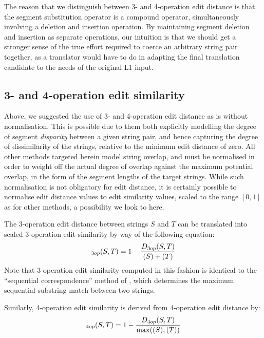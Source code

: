 The reason that we distinguish between 3- and 4-operation edit distance
is that the segment substitution operator is a compound operator,
simultaneously involving a deletion and insertion operation. By
maintaining segment deletion and insertion as separate operations, our
intuition is that we should get a stronger sense of the true effort
required to coerce an arbitrary string pair together, as a translator
would have to do in adapting the final translation candidate to the
needs of the original L1 input.


\subsection*{3- and 4-operation edit similarity}

Above, we suggested the use of 3- and 4-operation edit distance as is
without normalisation. This is possible due to them both explicitly
modelling the degree of segment {\it disparity} between a given
string pair, and hence capturing the degree of dissimilarity of the
strings, relative to the minimum edit distance of zero. All other
methods targeted herein model string overlap, and must be normalised in
order to weight off the actual degree of overlap against the maximum
potential overlap, in the form of the segment lengths of the target
strings. While such normalisation is not obligatory for edit distance,
it is certainly possible to normalise edit distance values to edit
similarity values, scaled to the range $[0,1]$ as for other methods, a
possibility we look to here.
 
The 3-operation edit distance between strings $S$ and $T$ can be
translated into scaled 3-operation edit similarity by way of the
following equation:
\begin{equation}
  \label{eqn:simple-edist-norm}
  \mathit{sim}_{3op}(S,T) = 1- \frac{D_{3op}(S,T)}{\len(S) +
    \len(T)}
\end{equation}
Note that 3-operation edit similarity computed in this fashion is
identical to the ``sequential correspondence'' method of
, which determines the maximum sequential
substring match between two strings.

Similarly, 4-operation edit similarity is derived from 4-operation edit
distance by:
\begin{equation}
  \label{eqn:classic-edist-norm}
  \mathit{sim}_{4op}(S,T) = 1 -
  \frac{D_{4op}(S,T)}{\max(\len(S),\len(T))}
\end{equation}



